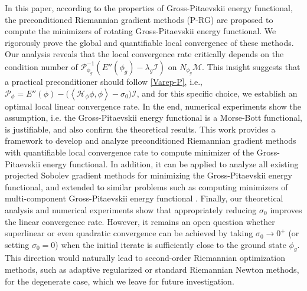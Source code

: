 \documentclass[preprint,3p]{elsarticle}
\begin{document}
In this paper, according to the properties of Gross-Pitaevskii energy functional, the preconditioned Riemannian gradient methods (P-RG) 
are proposed to compute the minimizers of rotating Gross-Pitaevskii energy functional. We rigorously prove the global and quantifiable local 
convergence of these methods. Our analysis reveals that the local convergence rate  critically depends on the condition number 
of \( \mathcal{P}^{-1}_{\phi_g}(E''(\phi_g)-\lambda_g\mathcal{I}) \) on \( N_{\phi_g}\mathcal{M} \). 
This insight suggests that a practical preconditioner should follow \eqref{Varep-P}, i.e.,
$\mathcal{P}_{\phi}=E''(\phi)-\big(\left\langle\mathcal{H}_{\phi}\phi,\phi\right\rangle-\sigma_0\big)\mathcal{I}$, and for this specific choice, we establish an optimal local linear convergence rate. 
In the end, numerical experiments 
show the assumption, i.e. the Gross-Pitaevskii energy functional is a Morse-Bott functional, 
is justifiable, and also confirm the theoretical results.
This work provides a framework to develop and  analyze  preconditioned Riemannian gradient methods with quantifiable local convergence rate
to compute minimizer of the Gross-Pitaevskii energy functional. 
In addition, it can be applied to analyze all existing projected Sobolev gradient methods for minimizing the Gross-Pitaevskii energy functional,
and extended to similar problems such as computing minimizers of multi-component  Gross-Pitaevskii energy functional \cite{2024Riem}. {Finally, our theoretical analysis and numerical experiments show that appropriately reducing $\sigma_0$ improves the linear convergence rate. However, it remains an open question whether superlinear or even quadratic convergence can be achieved by taking $\sigma_0 \to 0^+$ (or setting $\sigma_0 = 0$) when the initial iterate is sufficiently close to the ground state $\phi_g$. This direction would naturally lead to second-order Riemannian optimization methods, such as adaptive regularized or standard Riemannian Newton methods, for the degenerate case, which we leave for future investigation.}
 \\
 \\
 \\


\appendix
\setcounter{equation}{0}
\end{document}
